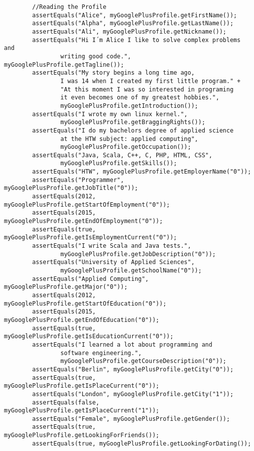 \documentclass[12pt]{article}
\begin{document}
\begin{verbatim}
        //Reading the Profile
        assertEquals("Alice", myGooglePlusProfile.getFirstName());
        assertEquals("Alpha", myGooglePlusProfile.getLastName());
        assertEquals("Ali", myGooglePlusProfile.getNickname());
        assertEquals("Hi I´m Alice I like to solve complex problems and
                writing good code.", myGooglePlusProfile.getTagline());
        assertEquals("My story begins a long time ago,
                I was 14 when I created my first little program." +
                "At this moment I was so interested in programing
                it even becomes one of my greatest hobbies.",
                myGooglePlusProfile.getIntroduction());
        assertEquals("I wrote my own linux kernel.", 
                myGooglePlusProfile.getBraggingRights());
        assertEquals("I do my bachelors degree of applied science
                at the HTW subject: applied computing",
                myGooglePlusProfile.getOccupation());
        assertEquals("Java, Scala, C++, C, PHP, HTML, CSS",
                myGooglePlusProfile.getSkills());
        assertEquals("HTW", myGooglePlusProfile.getEmployerName("0"));
        assertEquals("Programmer", myGooglePlusProfile.getJobTitle("0"));
        assertEquals(2012, myGooglePlusProfile.getStartOfEmployment("0"));
        assertEquals(2015, myGooglePlusProfile.getEndOfEmployment("0"));
        assertEquals(true, myGooglePlusProfile.getIsEmploymentCurrent("0"));
        assertEquals("I write Scala and Java tests.", 
                myGooglePlusProfile.getJobDescription("0"));
        assertEquals("University of Applied Sciences",
                myGooglePlusProfile.getSchoolName("0"));
        assertEquals("Applied Computing", myGooglePlusProfile.getMajor("0"));
        assertEquals(2012, myGooglePlusProfile.getStartOfEducation("0"));
        assertEquals(2015, myGooglePlusProfile.getEndOfEducation("0"));
        assertEquals(true, myGooglePlusProfile.getIsEducationCurrent("0"));
        assertEquals("I learned a lot about programming and
                software engineering.",
                myGooglePlusProfile.getCourseDescription("0"));
        assertEquals("Berlin", myGooglePlusProfile.getCity("0"));
        assertEquals(true, myGooglePlusProfile.getIsPlaceCurrent("0"));
        assertEquals("London", myGooglePlusProfile.getCity("1"));
        assertEquals(false, myGooglePlusProfile.getIsPlaceCurrent("1"));
        assertEquals("Female", myGooglePlusProfile.getGender());
        assertEquals(true, myGooglePlusProfile.getLookingForFriends());
        assertEquals(true, myGooglePlusProfile.getLookingForDating());

\end{verbatim}
\end{document}
